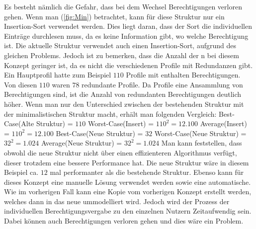 Es besteht nämlich die Gefahr, dass bei dem Wechsel Berechtigungen verloren gehen.
\newline
\newline
Wenn man (\ref{fig:Min}) betrachtet, kann für diese Struktur nur ein Insertion-Sort verwendet werden.
Dies liegt daran, dass der Sort die individuellen Einträge durchlesen muss, da es keine Information gibt, wo welche Berechtigung ist.
Die aktuelle Struktur verwendet auch einen Insertion-Sort, aufgrund des gleichen Problems.
Jedoch ist zu bemerken, dass die Anzahl der n bei diesem Konzept geringer ist, da es nicht die verschiedenen Profile mit Redundanzen gibt.
\newline
\newline
Ein Hauptprofil hatte zum Beispiel $110$ Profile mit enthalten Berechtigungen.
Von diesen $110$ waren $78$ redundante Profile.
Da Profile eine Ansammlung von Berechtigungen sind, ist die Anzahl von redundanten Berechtigungen deutlich höher.
Wenn man nur den Unterschied zwischen der bestehenden Struktur mit der minimalistischen Struktur macht, erhält man folgenden Vergleich:
\newline
\newline
Best-Case(Alte Struktur) = $110$
\newline
Worst-Case(Insert) = $110^2 = 12.100$
\newline
Average(Insert) = $110^2 = 12.100$
\newline
\newline
Best-Case(Neue Struktur) = $32$
\newline
Worst-Case(Neue Struktur) = $32^2 = 1.024$
\newline
Average(Neue Struktur) = $32^2 = 1.024$
\newline
\newline
Man kann feststellen, dass obwohl die neue Struktur nicht über einen effizienteren Algorithmus verfügt, dieser trotzdem eine bessere Performance hat.
Die neue Struktur wäre in diesem Beispiel ca. $12$ mal performanter als die bestehende Struktur.
\newline
\newline
Ebenso kann für dieses Konzept eine manuelle Lösung verwendet werden sowie eine automatische.
Wie im vorherigen Fall kann eine Kopie vom vorherigen Konzept erstellt werden, welches dann in das neue ummodelliert wird.
Jedoch wird der Prozess der individuellen Berechtigungsvergabe zu den einzelnen Nutzern Zeitaufwendig sein.
Dabei können auch Berechtigungen verloren gehen und dies wäre ein Problem.
\newline
